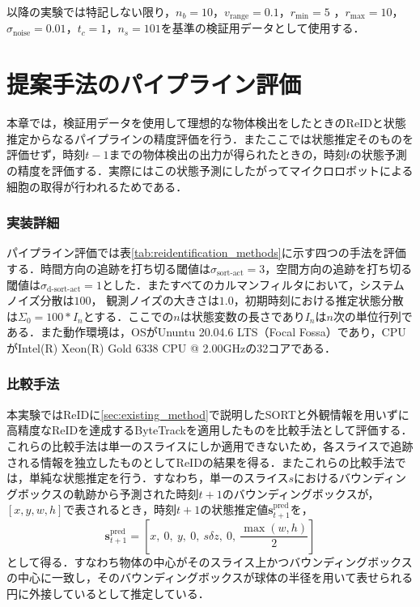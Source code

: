 以降の実験では特記しない限り，$n_b = 10$，$v_{\text{range}} = 0.1$，$r_{\text{min}} = 5$ ，$r_{\text{max}} = 10$，$\sigma_{\text{noise}} = 0.01$，$t_c = 1$，$n_s = 101$を基準の検証用データとして使用する．

\section{提案手法のパイプライン評価}
\label{sec:pipeline_evaluation}

本章では，検証用データを使用して理想的な物体検出をしたときのReIDと状態推定からなるパイプラインの精度評価を行う．またここでは状態推定そのものを評価せず，時刻$t-1$までの物体検出の出力が得られたときの，時刻$t$の状態予測の精度を評価する．実際にはこの状態予測にしたがってマイクロロボットによる細胞の取得が行われるためである．

\subsubsection{実装詳細}
パイプライン評価では表\ref{tab:reidentification_methods}に示す四つの手法を評価する．時間方向の追跡を打ち切る閾値は$\sigma_{\text{sort-act}} = 3$，空間方向の追跡を打ち切る閾値は$\sigma_{\text{d-sort-act}} = 1$とした．またすべてのカルマンフィルタにおいて，システムノイズ分散は$100$，
観測ノイズの大きさは$1.0$，初期時刻における推定状態分散は$\Sigma_0 = 100 * I_n$とする．ここでの$n$は状態変数の長さであり$I_n$は$n$次の単位行列である．また動作環境は，OSがUnuntu 20.04.6 LTS（Focal Fossa）であり，CPUがIntel(R) Xeon(R) Gold 6338 CPU @ 2.00GHzの32コアである．

\subsubsection{比較手法}
本実験ではReIDに\ref{sec:existing_method}で説明したSORTと外観情報を用いずに高精度なReIDを達成するByteTrack\cite{zhang2022bytetrack}を適用したものを比較手法として評価する．これらの比較手法は単一のスライスにしか適用できないため，各スライスで追跡される情報を独立したものとしてReIDの結果を得る．またこれらの比較手法では，単純な状態推定を行う．すなわち，単一のスライス$s$におけるバウンディングボックスの軌跡から予測された時刻$t + 1$のバウンディングボックスが，$[x, y, w, h]$で表されるとき，時刻$t+1$の状態推定値$\bm{s}_{t+1}^{\text{pred}}$を，
\begin{equation}
    \label{eq:naive_state_estimation}
    \bm{s}^{\text{pred}}_{t+1} = \left[x,~ 0,~ y,~ 0,~ s \delta z,~ 0,~ \frac{\max(w, h)}{2}\right]
\end{equation}
として得る．すなわち物体の中心がそのスライス上かつバウンディングボックスの中心に一致し，そのバウンディングボックスが球体の半径を用いて表せられる円に外接しているとして推定している．


